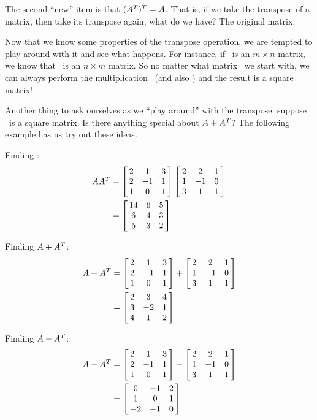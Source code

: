 The second ``new'' item is that $(\ttat)^T = \tta$. That is, if we take the transpose of a matrix, then take its transpose again, what do we have? The original matrix.

Now that we know some properties of the transpose operation, we are tempted to play around with it and see what happens. For instance, if \tta\ is an $m\times n$ matrix, we know that \ttat\ is an $n\times m$ matrix. So no matter what matrix \tta\ we start with, we can always perform the multiplication \tta\ttat\ (and also \ttat\tta) and the result is a square matrix! 

Another thing to ask ourselves as we ``play around'' with the transpose: suppose \tta\ is a square matrix. Is there anything special about $\tta+\ttat$? The following example has us try out these ideas.\\

{Finding \tta\ttat:
\begin{align*}
	\tta\ttat &= \bmx{ccc}2&1&3\\2&-1&1\\1&0&1\emx\bmx{ccc}2&2&1\\1&-1&0\\3&1&1\emx \\					
						&= \bmx{ccc}14 & 6 & 5\\ 6&4&3\\ 5& 3& 2\emx
\end{align*}

Finding $\tta+\ttat$:
\begin{align*}
	\tta+\ttat 	&= \bmx{ccc}2&1&3\\2&-1&1\\1&0&1\emx+\bmx{ccc}2&2&1\\1&-1&0\\3&1&1\emx\\
							&= \bmx{ccc}2&3&4\\3&-2&1\\4&1&2\emx
\end{align*}

Finding $\tta-\ttat$:
\begin{align*}
	\tta-\ttat 	&=	\bmx{ccc}2&1&3\\2&-1&1\\1&0&1\emx-\bmx{ccc}2&2&1\\1&-1&0\\3&1&1\emx\\
						&=	\bmx{ccc} 0&-1&2\\1&0&1\\-2&-1&0\emx
\end{align*}
\ } \\ %

